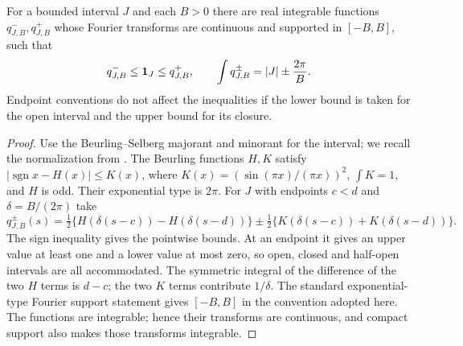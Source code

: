 \begin{lemma}
\label{lem:collision-interval-envelopes}
For a bounded interval $J$ and each $B>0$ there are real integrable
functions $q_{J,B}^-,q_{J,B}^+$ whose Fourier transforms are continuous
and supported in $[-B,B]$, such that
\begin{equation}\label{eq:collision-interval-envelopes}
 q_{J,B}^-\le\one_J\le q_{J,B}^+,
 \qquad \int q_{J,B}^{\pm}=|J|\pm\frac{2\pi}{B}.
\end{equation}
Endpoint conventions do not affect the inequalities if the lower
bound is taken for the open interval and the upper bound for its closure.
\end{lemma}
\begin{proof}
Use the Beurling--Selberg majorant and minorant for the interval;
we recall the normalization from \cite[Introduction]{CVExt}.
The Beurling functions $H,K$ satisfy
$|\operatorname{sgn}x-H(x)|\le K(x)$, where
$K(x)=(\sin(\pi x)/(\pi x))^2$, $\int K=1$, and $H$ is odd.
Their exponential type is $2\pi$. For $J$ with endpoints $c<d$ and
$\delta=B/(2\pi)$ take
\[
 q_{J,B}^{\pm}(s)=
 \tfrac12\{H(\delta(s-c))-H(\delta(s-d))\}
 \mathbin{\pm}\tfrac12\{K(\delta(s-c))+K(\delta(s-d))\}.
\]
The sign inequality gives the pointwise bounds. At an endpoint it gives
an upper value at least one and a lower value at most zero, so open,
closed and half-open intervals are all accommodated. The symmetric
integral of the difference of the two $H$ terms is $d-c$; the two
$K$ terms contribute $1/\delta$. The standard exponential-type
Fourier support statement gives $[-B,B]$ in the convention adopted
here. The functions are integrable; hence their transforms are
continuous, and compact support also makes those transforms integrable.
\end{proof}

